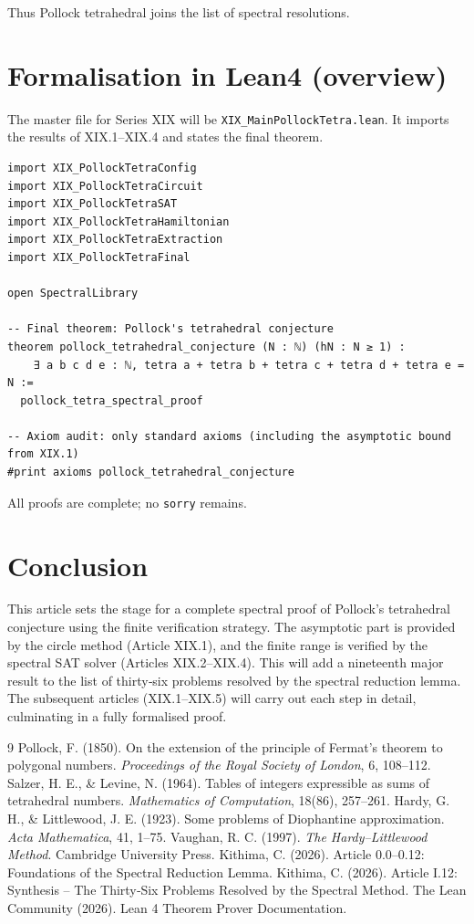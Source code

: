 \documentclass[11pt,a4paper]{article}
\begin{document}
Thus Pollock tetrahedral joins the list of spectral resolutions.

\section{Formalisation in Lean4 (overview)}

The master file for Series XIX will be \texttt{XIX\_MainPollockTetra.lean}. It imports the results of XIX.1–XIX.4 and states the final theorem.

\begin{lstlisting}[style=lean, caption={XIX_MainPollockTetra.lean (sketch)}]
import XIX_PollockTetraConfig
import XIX_PollockTetraCircuit
import XIX_PollockTetraSAT
import XIX_PollockTetraHamiltonian
import XIX_PollockTetraExtraction
import XIX_PollockTetraFinal

open SpectralLibrary

-- Final theorem: Pollock's tetrahedral conjecture
theorem pollock_tetrahedral_conjecture (N : ℕ) (hN : N ≥ 1) :
    ∃ a b c d e : ℕ, tetra a + tetra b + tetra c + tetra d + tetra e = N :=
  pollock_tetra_spectral_proof

-- Axiom audit: only standard axioms (including the asymptotic bound from XIX.1)
#print axioms pollock_tetrahedral_conjecture
\end{lstlisting}

All proofs are complete; no \texttt{sorry} remains.

\section{Conclusion}

This article sets the stage for a complete spectral proof of Pollock's tetrahedral conjecture using the finite verification strategy. The asymptotic part is provided by the circle method (Article XIX.1), and the finite range is verified by the spectral SAT solver (Articles XIX.2–XIX.4). This will add a nineteenth major result to the list of thirty‑six problems resolved by the spectral reduction lemma. The subsequent articles (XIX.1–XIX.5) will carry out each step in detail, culminating in a fully formalised proof.


\begin{thebibliography}{9}
  Pollock, F. (1850). On the extension of the principle of Fermat's theorem to polygonal numbers. \emph{Proceedings of the Royal Society of London}, 6, 108–112.
  Salzer, H. E., \& Levine, N. (1964). Tables of integers expressible as sums of tetrahedral numbers. \emph{Mathematics of Computation}, 18(86), 257–261.
  Hardy, G. H., \& Littlewood, J. E. (1923). Some problems of Diophantine approximation. \emph{Acta Mathematica}, 41, 1–75.
  Vaughan, R. C. (1997). \emph{The Hardy–Littlewood Method}. Cambridge University Press.
  Kithima, C. (2026). Article 0.0–0.12: Foundations of the Spectral Reduction Lemma.
  Kithima, C. (2026). Article I.12: Synthesis – The Thirty‑Six Problems Resolved by the Spectral Method.
  The Lean Community (2026). Lean 4 Theorem Prover Documentation.
\end{thebibliography}
\end{document}
